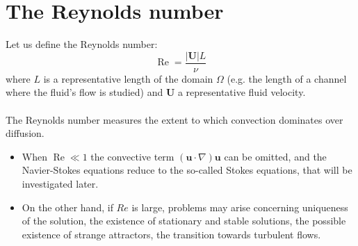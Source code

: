 \documentclass[11pt]{book}
\begin{document}
\section{The Reynolds number}
Let us define the Reynolds number:
$$
\operatorname{Re}=\frac{|\mathbf{U}| L}{\nu}
$$
where $L$ is a representative length of the domain $\Omega$ (e.g. the length of a channel where the fluid's flow is studied) and $\mathbf{U}$ a representative fluid velocity.\\ \\
The Reynolds number measures the extent to which convection dominates over diffusion.
\begin{itemize}
  \item When $\operatorname{Re} \ll 1$ the convective term $(\mathbf{u} \cdot \nabla) \mathbf{u}$ can be omitted, and the Navier-Stokes equations reduce to the so-called Stokes equations, that will be investigated later.
  \item On the other hand, if $R e$ is large, problems may arise concerning uniqueness of the solution, the existence of stationary and stable solutions, the possible existence of strange attractors, the transition towards turbulent flows.
\end{itemize}
\end{document}
